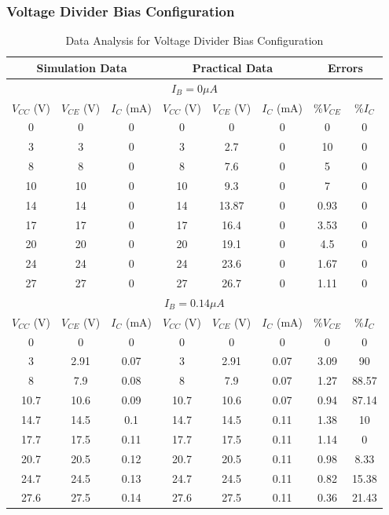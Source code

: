 \documentclass[12pt]{article}
\begin{document}
\newpage
\subsubsection{Voltage Divider Bias Configuration}
\bgroup
\def\arraystretch{1.5}
\begin{table}[h!]
    \centering
    \begin{tabular}{|c|c|c||c|c|c||c|c|}
        \hline
        \multicolumn{3}{|c||}{\textbf{Simulation Data}} & \multicolumn{3}{|c||}{\textbf{Practical Data}} & \multicolumn{2}{|c|}{\textbf{Errors}} \\ \hline\hline
        \multicolumn{8}{|c|}{\textbf{$I_B = 0\mu A$}} \\ \hline
        $V_{CC}$ (V) & $V_{CE}$ (V) & $I_C$ (mA) & $V_{CC}$ (V) & $V_{CE}$ (V) & $I_C$ (mA) & \%$V_{CE}$ & \%$I_C$ \\ \hline
        0 & 0 & 0 & 0 & 0 & 0 & 0 & 0 \\
        3 & 3 & 0 & 3 & 2.7 & 0 & 10 & 0 \\
        8 & 8 & 0 & 8 & 7.6 & 0 & 5 & 0 \\
        10 & 10 & 0 & 10 & 9.3 & 0 & 7 & 0 \\
        14 & 14 & 0 & 14 & 13.87 & 0 & 0.93 & 0 \\
        17 & 17 & 0 & 17 & 16.4 & 0 & 3.53 & 0 \\
        20 & 20 & 0 & 20 & 19.1 & 0 & 4.5 & 0 \\
        24 & 24 & 0 & 24 & 23.6 & 0 & 1.67 & 0 \\
        27 & 27 & 0 & 27 & 26.7 & 0 & 1.11 & 0 \\ \hline\hline
        \multicolumn{8}{|c|}{\textbf{$I_B = 0.14\mu A$}} \\ \hline
        $V_{CC}$ (V) & $V_{CE}$ (V) & $I_C$ (mA) & $V_{CC}$ (V) & $V_{CE}$ (V) & $I_C$ (mA) & \%$V_{CE}$ & \%$I_C$ \\ \hline
        0 & 0 & 0 & 0 & 0 & 0 & 0 & 0 \\
        3 & 2.91 & 0.07 & 3 & 2.91 & 0.07 & 3.09 & 90 \\
        8 & 7.9 & 0.08 & 8 & 7.9 & 0.07 & 1.27 & 88.57 \\
        10.7 & 10.6 & 0.09 & 10.7 & 10.6 & 0.07 & 0.94 & 87.14 \\
        14.7 & 14.5 & 0.1 & 14.7 & 14.5 & 0.11 & 1.38 & 10 \\
        17.7 & 17.5 & 0.11 & 17.7 & 17.5 & 0.11 & 1.14 & 0 \\
        20.7 & 20.5 & 0.12 & 20.7 & 20.5 & 0.11 & 0.98 & 8.33 \\
        24.7 & 24.5 & 0.13 & 24.7 & 24.5 & 0.11 & 0.82 & 15.38 \\
        27.6 & 27.5 & 0.14 & 27.6 & 27.5 & 0.11 & 0.36 & 21.43 \\ \hline
    \end{tabular}
    \caption{Data Analysis for Voltage Divider Bias Configuration}
    \label{Voltage Divider Bias}
\end{table}
\end{document}
